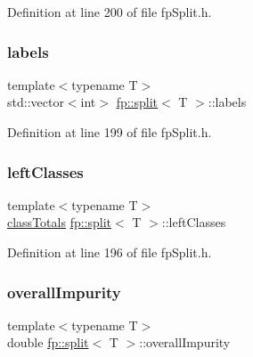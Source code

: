 Definition at line 200 of file fp\+Split.\+h.

\mbox{\label{classfp_1_1split_a9658b163c2cd30e9900e21c3b1c3f2f9}} 
\subsubsection{\texorpdfstring{labels}{labels}}
{\footnotesize\ttfamily template$<$typename T$>$ \\
std\+::vector$<$int$>$ \hyperlink{classfp_1_1split}{fp\+::split}$<$ T $>$\+::labels\hspace{0.3cm}{\ttfamily [protected]}}



Definition at line 199 of file fp\+Split.\+h.

\mbox{\label{classfp_1_1split_a3be6dcf32281715e6376e9f5f8da18f0}} 
\subsubsection{\texorpdfstring{left\+Classes}{leftClasses}}
{\footnotesize\ttfamily template$<$typename T$>$ \\
\hyperlink{classfp_1_1classTotals}{class\+Totals} \hyperlink{classfp_1_1split}{fp\+::split}$<$ T $>$\+::left\+Classes\hspace{0.3cm}{\ttfamily [protected]}}



Definition at line 196 of file fp\+Split.\+h.

\mbox{\label{classfp_1_1split_a1eba74d8afed2852da3eb004afe76bb7}} 
\subsubsection{\texorpdfstring{overall\+Impurity}{overallImpurity}}
{\footnotesize\ttfamily template$<$typename T$>$ \\
double \hyperlink{classfp_1_1split}{fp\+::split}$<$ T $>$\+::overall\+Impurity\hspace{0.3cm}{\ttfamily [protected]}}




